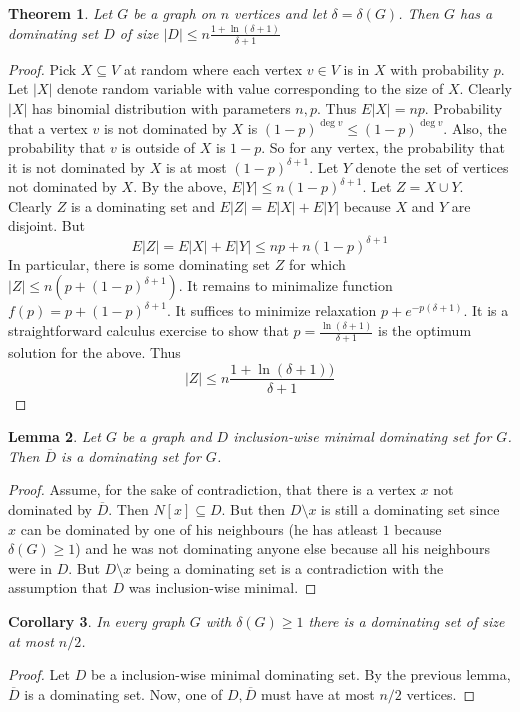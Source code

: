 \documentclass{article}
\theoremstyle{plain}
\newtheorem{thm}{Theorem}[section]
\newtheorem{lem}[thm]{Lemma}
\newtheorem{dus}[thm]{Corollary}
\theoremstyle{definition}
\begin{document}
\begin{thm}
	Let $G$ be a graph on $n$ vertices and let $\delta=\delta(G)$. Then $G$ has a dominating set $D$ of size $|D|\leq n\frac{1+\ln(\delta + 1)}{\delta + 1}$
\end{thm}
\begin{proof}
	Pick $X\subseteq V$ at random where each vertex $v\in V$ is in $X$ with probability $p$. Let $|X|$ denote random variable with value corresponding to the size of $X$. Clearly $|X|$ has binomial distribution with parameters $n,p$. Thus $E|X|=np$. Probability that a vertex $v$ is not dominated by $X$ is $(1-p)^{\deg v}\leq (1-p)^{\deg v}$. Also, the probability that $v$ is outside of $X$ is $1-p$. So for any vertex, the probability that it is not dominated by $X$ is at most $(1-p)^{\delta+1}$. Let $Y$ denote the set of vertices not dominated by $X$. By the above, $E|Y|\leq n (1-p)^{\delta + 1}$. Let $Z=X\cup Y$. Clearly $Z$ is a dominating set and $E|Z|=E|X|+E|Y|$ because $X$ and $Y$ are disjoint. But
	$$
	E|Z|=E|X| + E|Y|\leq np+n(1-p)^{\delta + 1}
	$$
	In particular, there is some dominating set $Z$ for which $|Z|\leq n(p+(1-p)^{\delta+1})$. It remains to minimalize function $f(p)=p+(1-p)^{\delta+1}$. It suffices to minimize relaxation $p+e^{-p(\delta + 1)}$. It is a straightforward calculus exercise to show that $p=\frac{\ln(\delta + 1)}{\delta + 1}$ is the optimum solution for the above. Thus 
	$$|Z|\leq n\frac{1+\ln(\delta + 1))}{\delta + 1}$$
\end{proof}

\begin{lem}
	Let $G$ be a graph and $D$ inclusion-wise minimal dominating set for $G$. Then $\overline{D}$ is a dominating set for $G$.
\end{lem}
\begin{proof}
	Assume, for the sake of contradiction, that there is a vertex $x$ not dominated by $\overline{D}$. Then $N[x]\subseteq D$. But then $D\setminus x$ is still a dominating set since $x$ can be dominated by one of his neighbours (he has atleast $1$ because $\delta(G)\geq 1$) and he was not dominating anyone else because all his neighbours were in $D$. But $D\setminus x$ being a dominating set is a contradiction with the assumption that $D$ was inclusion-wise minimal.
\end{proof}

\begin{dus}
	In every graph $G$ with $\delta(G)\geq 1$ there is a dominating set of size at most $n/2$.
\end{dus}
\begin{proof}
	Let $D$ be a inclusion-wise minimal dominating set. By the previous lemma, $\overline{D}$ is a dominating set. Now, one of $D,\overline{D}$ must have at most $n/2$ vertices.
\end{proof}
\end{document}
